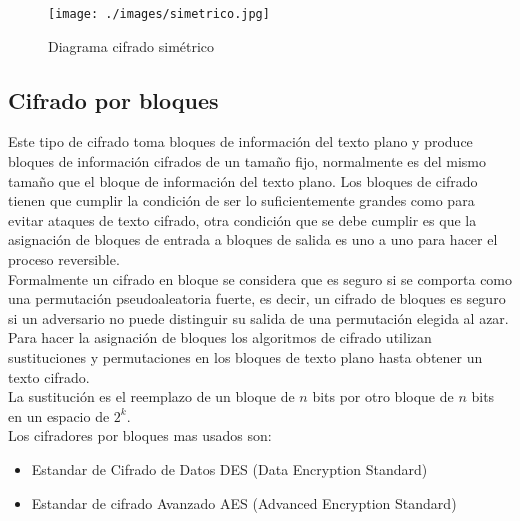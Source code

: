 \begin{figure}[H]
\centering
	\texttt{[image: ./images/simetrico.jpg]}
	\caption{Diagrama cifrado simétrico}
	\label{fig:1-2-1}
\end{figure}

\subsection{Cifrado por bloques}
Este tipo de cifrado toma bloques de información del texto plano y produce bloques de información cifrados de un tamaño fijo, normalmente es del mismo tamaño que el bloque de información del texto plano. Los bloques de cifrado tienen que cumplir la condición de ser lo suficientemente grandes como para evitar ataques de texto cifrado, otra condición que se debe cumplir es que la asignación de bloques de entrada a bloques de salida es uno a uno para hacer el proceso reversible.\\
Formalmente un cifrado en bloque se considera que es seguro si se comporta como una permutación pseudoaleatoria fuerte, es decir, un cifrado de bloques es seguro si un adversario no puede distinguir su salida de una permutación elegida al azar.\\
Para hacer la asignación de bloques los algoritmos de cifrado utilizan sustituciones y permutaciones en los bloques de texto plano hasta obtener un texto cifrado.\\
La sustitución es el reemplazo de un bloque de $n$ bits por otro bloque de $n$ bits en un espacio de \(2^{k}\).\cite{bloc}\\
Los cifradores por bloques mas usados son:
\begin{itemize}
 \item Estandar de Cifrado de Datos DES (Data Encryption Standard)
 \item Estandar de cifrado Avanzado AES (Advanced Encryption Standard)
\end{itemize}


